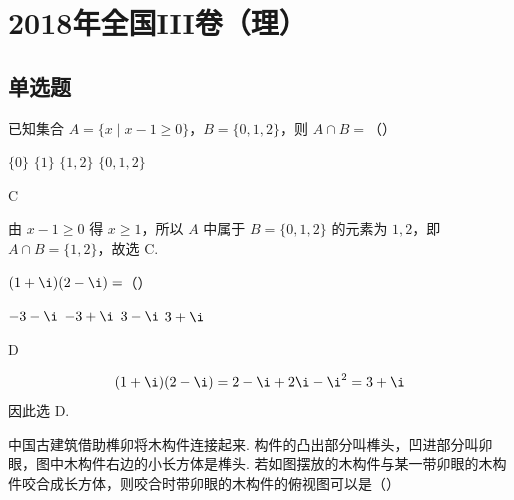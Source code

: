\chapter{2018年全国III卷（理）}

\section{单选题}

\begin{problem}
已知集合 \(A=\{x\mid x-1\ge0\}\)，\(B=\{0,1,2\}\)，则 \(A\cap B=\)（\quad）

\choices
    {\(\{0\}\)}
    {\(\{1\}\)}
    {\(\{1,2\}\)}
    {\(\{0,1,2\}\)}
\end{problem}

\begin{answer}
C
\end{answer}

\begin{solution}
由 \(x-1\ge0\) 得 \(x\ge1\)，所以 \(A\) 中属于 \(B=\{0,1,2\}\) 的元素为 \(1,2\)，即 \(A\cap B=\{1,2\}\)，故选 C.
\end{solution}

\begin{problem}
\((1+\i)(2-\i)=\)（\quad）

\choices
    {\(-3-\i\)}
    {\(-3+\i\)}
    {\(3-\i\)}
    {\(3+\i\)}
\end{problem}

\begin{answer}
D
\end{answer}

\begin{solution}
\[
(1+\i)(2-\i)=2-\i+2\i-\i^2=3+\i
\]
因此选 D.
\end{solution}

\begin{problem}
中国古建筑借助榫卯将木构件连接起来. 构件的凸出部分叫榫头，凹进部分叫卯眼，图中木构件右边的小长方体是榫头. 若如图摆放的木构件与某一带卯眼的木构件咬合成长方体，则咬合时带卯眼的木构件的俯视图可以是（\quad）


    {}
    {}
    {}
\end{problem}

